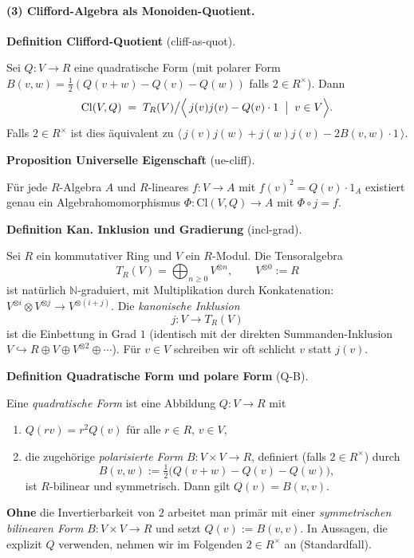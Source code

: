 \documentclass[10pt, letterpaper]{article}
\newcommand{\Cl}{\mathrm{Cl}}
\newcommand{\CustomHeading}[3]{%
  \par\medskip\noindent%
  \textbf{#1 #2} \textnormal{(#3)}.\enskip%
}
\newenvironment{DEF}[2]{\begin{unitbox}\CustomHeading{Definition}{#1}{#2}}{\end{unitbox}}
\newenvironment{PROP}[2]{\begin{unitbox}\CustomHeading{Proposition}{#1}{#2}}{\end{unitbox}}
\begin{document}
\paragraph{(3) Clifford-Algebra als Monoiden-Quotient.}
\begin{DEF}{Clifford-Quotient}{cliff-as-quot}
Sei \(Q:V\to R\) eine quadratische Form (mit polarer Form \(B(v,w)=\tfrac{1}{2}(Q(v+w)-Q(v)-Q(w))\) falls \(2\in R^\times\)).
Dann
\[
\Cl(V,Q)\;=\;T_R(V)\big/\Big\langle\, j(v)j(v)-Q(v)\cdot 1 \;\bigm|\; v\in V\Big\rangle.
\]
Falls \(2\in R^\times\) ist dies äquivalent zu
\(
\big\langle\, j(v)j(w)+j(w)j(v)-2B(v,w)\cdot 1 \,\big\rangle.
\)
\end{DEF}

\begin{PROP}{Universelle Eigenschaft}{ue-cliff}
Für jede \(R\)-Algebra \(A\) und \(R\)-lineares \(f:V\to A\) mit \(f(v)^2=Q(v)\cdot 1_A\) existiert genau ein Algebrahomomorphismus \(\Phi:\Cl(V,Q)\to A\) mit \(\Phi\circ j=f\).
\end{PROP}




\begin{DEF}{Kan. Inklusion und Gradierung}{incl-grad}
Sei $R$ ein kommutativer Ring und $V$ ein $R$-Modul. Die Tensoralgebra
\[
T_R(V)=\bigoplus_{n\ge 0} V^{\otimes n},\qquad V^{\otimes 0}:=R
\]
ist natürlich $\mathbb{N}$-graduiert, mit Multiplikation durch Konkatenation:
$V^{\otimes i}\otimes V^{\otimes j}\to V^{\otimes(i+j)}$.
Die \emph{kanonische Inklusion}
\[
j:V\longrightarrow T_R(V)
\]
ist die Einbettung in Grad $1$ (identisch mit der direkten Summanden-Inklusion
$V\hookrightarrow R\oplus V\oplus V^{\otimes 2}\oplus\cdots$).
Für $v\in V$ schreiben wir oft schlicht $v$ statt $j(v)$.
\end{DEF}

\begin{DEF}{Quadratische Form und polare Form}{Q-B}
Eine \emph{quadratische Form} ist eine Abbildung $Q:V\to R$ mit
\begin{enumerate}[label=(\roman*),leftmargin=*]
\item $Q(rv)=r^2Q(v)$ für alle $r\in R$, $v\in V$,
\item die zugehörige \emph{polarisierte Form} $B:V\times V\to R$, definiert (falls $2\in R^\times$) durch
\[
B(v,w):=\tfrac12\big(Q(v+w)-Q(v)-Q(w)\big),
\]
ist $R$-bilinear und symmetrisch. Dann gilt $Q(v)=B(v,v)$.
\end{enumerate}
\textbf{Ohne} die Invertierbarkeit von $2$ arbeitet man primär mit einer \emph{symmetrischen bilinearen Form}
$B:V\times V\to R$ und setzt $Q(v):=B(v,v)$. In Aussagen, die explizit $Q$ verwenden, nehmen wir im Folgenden
$2\in R^\times$ an (Standardfall).
\end{DEF}
\end{document}
